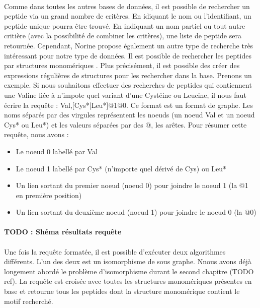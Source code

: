 \documentclass[12pt,french,twoside]{report}
\begin{document}
\paragraph{}Comme dans toutes les autres bases de données, il est possible de rechercher un peptide via un grand nombre de critères.
En idiquant le nom ou l'identifiant, un peptide unique pourra être trouvé.
En indiquant un nom partiel ou tout autre critière (avec la possibilité de combiner les critères), une liste de peptide sera retournée.
Cependant, Norine propose également un autre type de recherche très intéressant pour notre type de données.
Il est possible de rechercher les peptides par structures monomériques \cite{caboche_structural_2009}.
Plus précisément, il est possible des créer des expressions régulières de structures pour les rechercher dans la base.
Prenons un exemple.
Si nous souhaitons effectuer des recherches de peptides qui contiennent une Valine liée à n'impote quel variant d'une Cystéine ou Leucine, il nous faut écrire la requête : Val,[Cys*|Leu*]@1@0.
Ce format est un format de graphe.
Les noms séparés par des virgules représentent les noeuds (un noeud Val et un noeud Cys* ou Leu*) et les valeurs séparées par des @, les arêtes.
Pour résumer cette requête, nous avons :
\begin{itemize}
 \item Le noeud 0 labellé par Val
 \item Le noeud 1 labellé par Cys* (n'importe quel dérivé de Cys) ou Leu*
 \item Un lien sortant du premier noeud (noeud 0) pour joindre le noeud 1 (la @1 en première position)
 \item Un lien sortant du deuxième noeud (noeud 1) pour joindre le noeud 0 (la @0)
\end{itemize}

\paragraph{TODO : Shéma résultats requête}

\paragraph{}Une fois la requête formatée, il est possible d'exécuter deux algorithmes différents.
L'un des deux est un isomorphisme de sous graphe.
Nnous avons déjà longement abordé le problème d'isomorphisme durant le second chapitre (TODO ref).
La requête est croisée avec toutes les structures monomériques présentes en base et retourne tous les peptides dont la structure monomérique contient le motif recherché.
\end{document}
